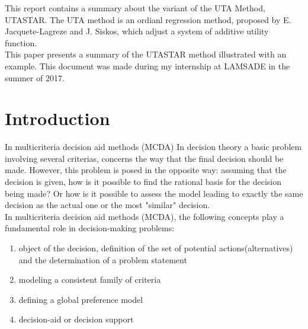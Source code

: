 \documentclass{report}
\begin{document}
\abstract 
This report contains a summary about the variant of the UTA Method, UTASTAR. The UTA method is an ordianl regression method, proposed by E. Jacquete-Lagreze and J. Siskos, which adjust a system of additive utility function.\\

This paper presents a summary of the UTASTAR method illustrated with an example. This document was made during my internship at LAMSADE in the summer of 2017.
\tableofcontents{}

\chapter{Introduction}
In multicriteria decision aid methods (MCDA) 
In decision theory a basic problem involving several criterias, concerns the way that the final decision should be made. However, this problem is posed in the opposite way: assuming that the decision is given, how is it possible to find the rational basis for the decision being made? Or how is it possible to assess the model leading to exactly the same decision as the actual one or the most "similar" decision.\\

In multicriteria decision aid methods (MCDA), the following concepts play a fundamental role in decision-making problems: 
\begin{enumerate}
\item object of the decision, definition of the set of potential actions(alternatives) and the determination of a problem statement
\item modeling a consistent family of criteria
\item defining a global preference model
\item decision-aid or decision support
\end{enumerate}
\end{document}
